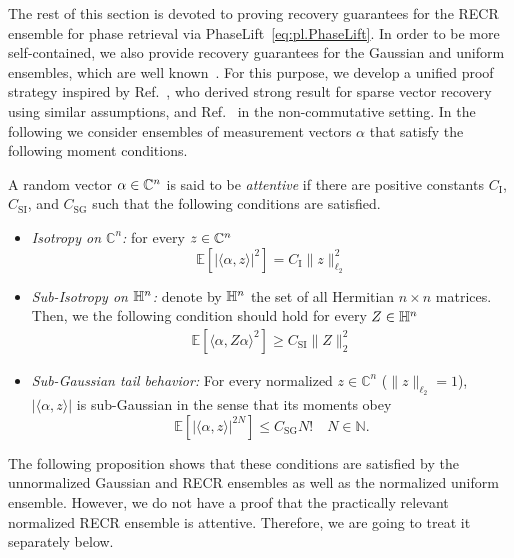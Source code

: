 The rest of this section is devoted to proving recovery guarantees for the RECR ensemble for phase retrieval via PhaseLift~\eqref{eq:pl.PhaseLift}.
In order to be more self-contained, we also provide recovery guarantees for the Gaussian and uniform ensembles, which are well known~\cite{Candes_2012_Solving,Demanet_2014_Stable}.
For this purpose, we develop a unified proof strategy inspired by Ref.~\cite{Dirksen_2017_On}, who derived strong result for sparse vector recovery using similar assumptions, and Ref.~\cite{Kabanava_2015_Stable} in the non-commutative setting.
In the following we consider ensembles of measurement vectors $\alpha$ that satisfy the following moment conditions.

\begin{definition}%
  \label{def:pl.attentive}
  A random vector $\alpha \in {\mathbb{C}}^n$ is said to be \emph{attentive} if there are positive constants $C_\mathrm{I}$, $C_\mathrm{SI}$, and $C_\mathrm{SG}$ such that the following conditions are satisfied.
  \begin{itemize}
    \item \emph{Isotropy on $\mathbb{C}^n$:} for every $z \in {\mathbb{C}}^n$
    \[
      \mathbb{E} \left[ | \langle \alpha,  z \rangle |^2 \right] = C_\mathrm{I} \|  z \|_{\ell_2}^2
      \label{eq:pl.tight_frame}
    \]

    \item \emph{Sub-Isotropy on $\mathbb{H}^n$:} denote by $\mathbb{H}^n$ the set of all Hermitian $n \times n$ matrices.
      Then, we the following condition should hold for every $Z \in \mathbb{H}^n$
    \begin{align}
      \mathbb{E} \left[ \langle \alpha,  Z \alpha \rangle^2 \right] \geq C_\mathrm{SI} \|  Z \|_2^2 \label{eq:pl.sub_isotropy}
    \end{align}

    \item \emph{Sub-Gaussian tail behavior:} For every normalized $ z \in \mathbb{C}^n$ ($\|  z \|_{\ell_2}=1$), $| \langle \alpha,  z \rangle|$ is sub-Gaussian in the sense that its moments obey
    \[
      \mathbb{E} \left[ | \langle \alpha,  z \rangle|^{2N} \right] \leq C_\mathrm{SG} N! \quad N \in \mathbb{N}.
    \label{eq:pl.subexponential}
    \]
  \end{itemize}
\end{definition}

The following proposition shows that these conditions are satisfied by the unnormalized Gaussian and RECR ensembles as well as the normalized uniform ensemble.
However, we do not have a proof that the practically relevant normalized RECR ensemble is attentive.
Therefore, we are going to treat it separately below.

